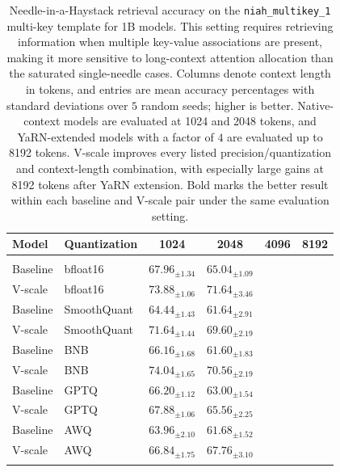 \documentclass{article}
\theoremstyle{plain}
\theoremstyle{definition}
\theoremstyle{remark}
\begin{document}
\begin{table}[ht]
    \centering
    \caption{
    Needle-in-a-Haystack retrieval accuracy on the \texttt{niah\_multikey\_1} multi-key template for 1B models.
    This setting requires retrieving information when multiple key-value associations are present, making it more sensitive to long-context attention allocation than the saturated single-needle cases.
    Columns denote context length in tokens, and entries are mean accuracy percentages with standard deviations over $5$ random seeds; higher is better.
    Native-context models are evaluated at 1024 and 2048 tokens, and YaRN-extended models with a factor of $4$ are evaluated up to 8192 tokens.
    V-scale improves every listed precision/quantization and context-length combination, with especially large gains at 8192 tokens after YaRN extension.
    Bold marks the better result within each baseline and V-scale pair under the same evaluation setting.
    }\label{tab:niah_multikey1_1b}
    \begin{tabular}{llcccc}
        \toprule
        Model & Quantization & 1024 & 2048 & 4096 & 8192 \\
        \midrule
        \rowcolor[gray]{0.9}\multicolumn{6}{l}{\emph{1B Models}} \\
        Baseline & bfloat16 & $67.96_{\pm 1.34}$ & $65.04_{\pm 1.09}$ & & \\
        V-scale & bfloat16 & $\mathbf{73.88}_{\pm 1.06}$ & $\mathbf{71.64}_{\pm 3.46}$ & & \\
        Baseline & SmoothQuant & $64.44_{\pm 1.43}$ & $61.64_{\pm 2.91}$ & & \\
        V-scale & SmoothQuant & $\mathbf{71.64}_{\pm 1.44}$ & $\mathbf{69.60}_{\pm 2.19}$ & & \\
        Baseline & BNB & $66.16_{\pm 1.68}$ & $61.60_{\pm 1.83}$ & & \\
        V-scale & BNB & $\mathbf{74.04}_{\pm 1.65}$ & $\mathbf{70.56}_{\pm 2.19}$ & & \\
        Baseline & GPTQ & $66.20_{\pm 1.12}$ & $63.00_{\pm 1.54}$ & & \\
        V-scale & GPTQ & $\mathbf{67.88}_{\pm 1.06}$ & $\mathbf{65.56}_{\pm 2.25}$ & & \\
        Baseline & AWQ & $63.96_{\pm 2.10}$ & $61.68_{\pm 1.52}$ & & \\
        V-scale & AWQ & $\mathbf{66.84}_{\pm 1.75}$ & $\mathbf{67.76}_{\pm 3.10}$ & & \\
        \midrule
        \rowcolor[gray]{0.9}\multicolumn{6}{l}{\emph{1B Models with YaRN Extension} (yarn\_factor$=4$)} \\

\end{tabular}
\end{table}
\end{document}
